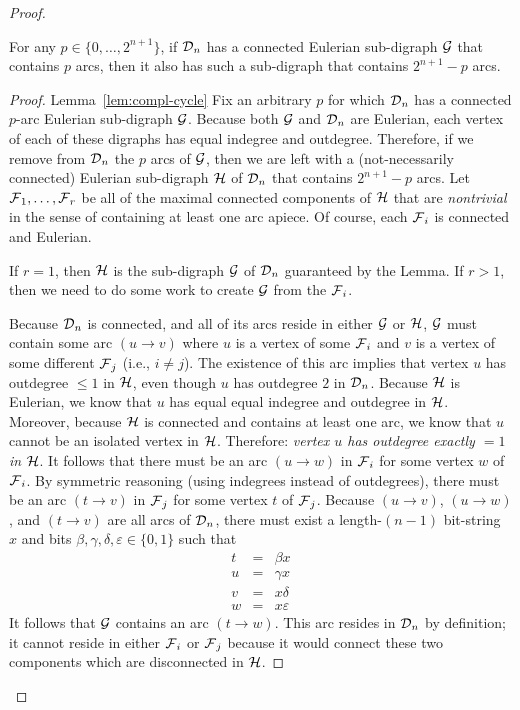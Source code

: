 \begin{proof}
\begin{lemma}
\label{lem:compl-cycle}
For any $p \in \{0, \ldots, 2^{n+1}\}$, if $\mbox{$\cal D$}_n$ has a connected Eulerian sub-digraph $\mbox{$\cal G$}$ that
contains $p$ arcs, then it also has such a sub-digraph that contains $2^{n+1} - p$ arcs.
\end{lemma}

\begin{proof}{Lemma~\ref{lem:compl-cycle}}
Fix an arbitrary $p$ for which $\mbox{$\cal D$}_n$ has a connected $p$-arc Eulerian sub-digraph $\mbox{$\cal G$}$.  Because
both $\mbox{$\cal G$}$ and $\mbox{$\cal D$}_n$ are Eulerian, each vertex of each of these digraphs has equal indegree and
outdegree.  Therefore, if we remove from $\mbox{$\cal D$}_n$ the $p$ arcs of $\mbox{$\cal G$}$, then we are left with a
(not-necessarily connected) Eulerian sub-digraph $\mbox{$\cal H$}$ of $\mbox{$\cal D$}_n$ that contains $2^{n+1} - p$ arcs.
Let $\mbox{$\cal F$}_1, \ldots, \mbox{$\cal F$}_r$ be all of the maximal connected components of $\mbox{$\cal H$}$ that are {\em nontrivial}
in the sense of containing at least one arc apiece.  Of course, each $\mbox{$\cal F$}_i$ is connected and
Eulerian.

If $r=1$, then $\mbox{$\cal H$}$ is the sub-digraph $\mbox{$\cal G$}$ of $\mbox{$\cal D$}_n$ guaranteed by the Lemma.
If $r>1$, then we need to do some work to create $\mbox{$\cal G$}$ from the $\mbox{$\cal F$}_i$.

Because $\mbox{$\cal D$}_n$ is connected, and all of its arcs reside in either $\mbox{$\cal G$}$ or $\mbox{$\cal H$}$, $\mbox{$\cal G$}$ must contain
some arc $(u \rightarrow v)$ where $u$ is a vertex of some $\mbox{$\cal F$}_i$ and $v$ is a vertex of some
different $\mbox{$\cal F$}_j$ (i.e., $i \neq j$).  The existence of this arc implies that vertex $u$ has outdegree
$\leq 1$ in $\mbox{$\cal H$}$, even though $u$ has outdegree $2$ in $\mbox{$\cal D$}_n$.  Because $\mbox{$\cal H$}$ is Eulerian, we know
that $u$ has equal equal indegree and outdegree in $\mbox{$\cal H$}$.  Moreover, because $\mbox{$\cal H$}$ is connected 
and contains at least one arc, we know that $u$ cannot be an isolated vertex in $\mbox{$\cal H$}$.  Therefore:
{\em vertex $u$ has outdegree {\em exactly} $=1$ in $\mbox{$\cal H$}$}.  It follows that there must be an arc
$(u \rightarrow w)$ in $\mbox{$\cal F$}_i$ for some vertex $w$ of $\mbox{$\cal F$}_i$.  By symmetric reasoning (using 
indegrees instead of outdegrees), there must be an arc  $(t \rightarrow v)$ in $\mbox{$\cal F$}_j$ for some 
vertex $t$ of $\mbox{$\cal F$}_j$.  Because $(u \rightarrow v)$, $(u \rightarrow w)$, and $(t \rightarrow v)$ are
all arcs of $\mbox{$\cal D$}_n$, there must exist a length-$(n-1)$ bit-string $x$ and bits
$\beta, \gamma, \delta, \varepsilon \in \{0,1\}$ such that
\begin{eqnarray*}
t & = & \beta x    \\
u & = & \gamma x   \\
v & = & x \delta   \\
w & = & x \varepsilon
\end{eqnarray*}
It follows that $\mbox{$\cal G$}$ contains an arc $(t \rightarrow w)$.  This arc resides in $\mbox{$\cal D$}_n$ by definition;
it cannot reside in either $\mbox{$\cal F$}_i$ or $\mbox{$\cal F$}_j$ because it would connect these two components which
are disconnected in $\mbox{$\cal H$}$.


\end{proof}
\end{proof}
